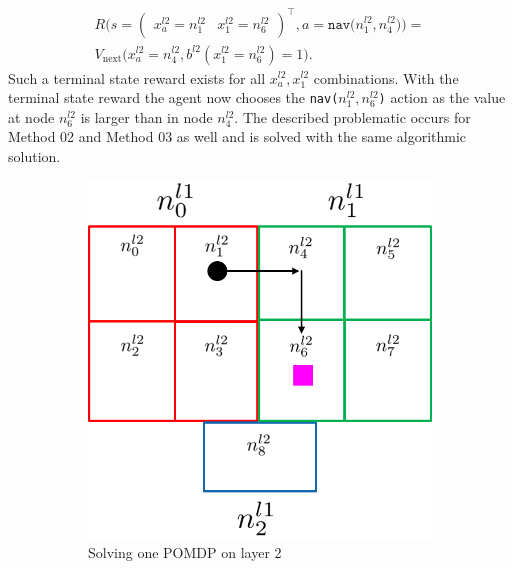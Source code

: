 \begin{multline}\label{eq:R_t_next}
    R\big( s=\begin{pmatrix} x_a^{l2}=n_1^{l2} & x_1^{l2}=n_6^{l2} \end{pmatrix}^\intercal, a=\texttt{nav($n_1^{l2}, n_4^{l2}$)} \big) = \\
    V_\text{next}\big( x_a^{l2}=n_4^{l2}, b^{l2}(x_1^{l2}=n_6^{l2})=1 \big).
\end{multline}
Such a terminal state reward exists for all $x_a^{l2}, x_1^{l2}$ combinations. With the terminal state reward the agent now chooses the \texttt{nav($n_1^{l2}, n_6^{l2}$)} action as the value at node $n_6^{l2}$ is larger than in node $n_4^{l2}$. The described problematic occurs for Method 02 and Method 03 as well and is solved with the same algorithmic solution. 
\begin{figure}
    \centering
    \begin{subfigure}[b]{0.45\textwidth}
        \includegraphics[width=\textwidth]{Report/images/two_terminal_states_longroute.png}
        \caption[t]{Solving one POMDP on layer 2}
        \label{subfig:longroute}
    \end{subfigure}
    \hfill
    \begin{subfigure}[b]{0.45\textwidth}

\end{subfigure}
\end{figure}
